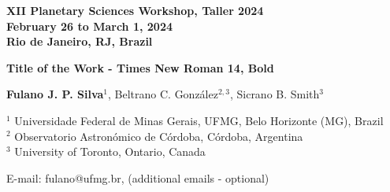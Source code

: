 \documentclass[11pt,english]{article}
\begin{document}
\begin{center}
\footnotesize
\textbf{XII Planetary Sciences Workshop, Taller 2024\\
February 26 to March 1, 2024\\
Rio de Janeiro, RJ, Brazil}\\
\vspace{0.8cm}

\Large
\textbf{Title of the Work - Times New Roman 14, Bold}
\vspace{0.8cm}

\normalsize
\textbf{Fulano J. P. Silva}$^{1}$, Beltrano C. González$^{2,3}$, Sicrano B. Smith$^{3}$
\vspace{0.4cm}

$^{1}$ Universidade Federal de Minas Gerais, UFMG, Belo Horizonte (MG), Brazil\\
$^{2}$ Observatorio Astronómico de Córdoba, Córdoba, Argentina\\
$^{3}$ University of Toronto, Ontario, Canada
\vspace{0.4cm}

E-mail: fulano@ufmg.br, (additional emails - optional)
\end{center}
\vspace{0.5cm}
\end{document}
